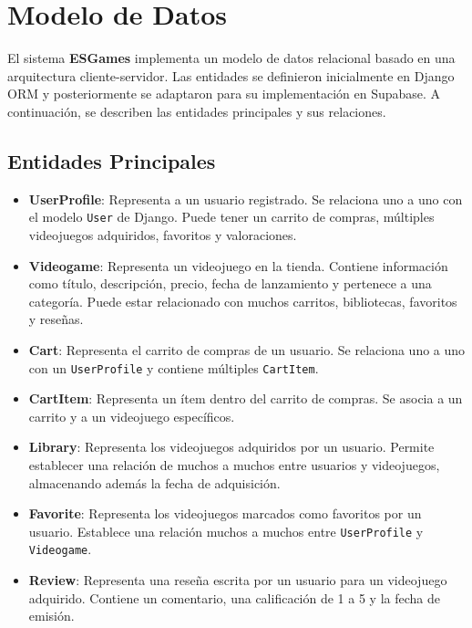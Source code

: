 \documentclass{article}
\begin{document}
		
\section{Modelo de Datos}

El sistema \textbf{ESGames} implementa un modelo de datos relacional basado en una arquitectura cliente-servidor. Las entidades se definieron inicialmente en Django ORM y posteriormente se adaptaron para su implementación en Supabase. A continuación, se describen las entidades principales y sus relaciones.

\subsection{Entidades Principales}

\begin{itemize}
  \item \textbf{UserProfile}: Representa a un usuario registrado. Se relaciona uno a uno con el modelo \texttt{User} de Django. Puede tener un carrito de compras, múltiples videojuegos adquiridos, favoritos y valoraciones.
  
  \item \textbf{Videogame}: Representa un videojuego en la tienda. Contiene información como título, descripción, precio, fecha de lanzamiento y pertenece a una categoría. Puede estar relacionado con muchos carritos, bibliotecas, favoritos y reseñas.
  
  \item \textbf{Cart}: Representa el carrito de compras de un usuario. Se relaciona uno a uno con un \texttt{UserProfile} y contiene múltiples \texttt{CartItem}.
  
  \item \textbf{CartItem}: Representa un ítem dentro del carrito de compras. Se asocia a un carrito y a un videojuego específicos.
  
  \item \textbf{Library}: Representa los videojuegos adquiridos por un usuario. Permite establecer una relación de muchos a muchos entre usuarios y videojuegos, almacenando además la fecha de adquisición.
  
  \item \textbf{Favorite}: Representa los videojuegos marcados como favoritos por un usuario. Establece una relación muchos a muchos entre \texttt{UserProfile} y \texttt{Videogame}.
  
  \item \textbf{Review}: Representa una reseña escrita por un usuario para un videojuego adquirido. Contiene un comentario, una calificación de 1 a 5 y la fecha de emisión.
\end{itemize}
\end{document}
